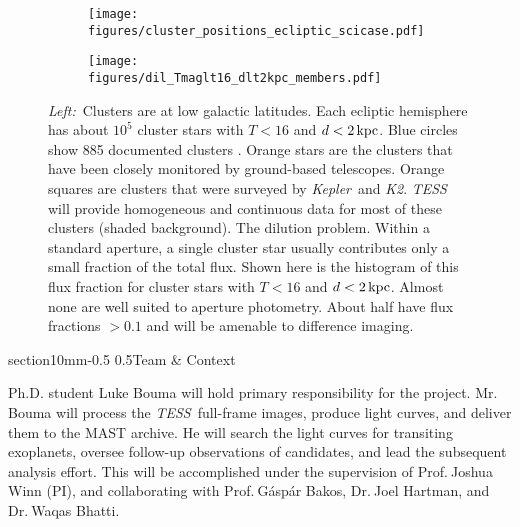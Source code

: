 \documentclass[letterpaper,11pt]{article}
\makeatletter
\renewcommand\section{\@startsection%
{section}{1}{0mm}{-0.5\baselineskip}%
{0.5\baselineskip}{\normalfont\normalsize\bfseries}}%
\newcommand{\tess}{{\it TESS}}
\newcommand{\kepler}{{\it Kepler}}
\newcommand{\ktwo}{{\it K2}}
\makeatother
\begin{document}
\begin{figure}[!tb]
    \begin{subfigure}{.6\textwidth}
        \centering
        \texttt{[image: figures/cluster\_positions\_ecliptic\_scicase.pdf]}
    \end{subfigure}
    \begin{subfigure}{.4\textwidth}
        \centering
        \texttt{[image: figures/dil\_Tmaglt16\_dlt2kpc\_members.pdf]}
    \end{subfigure}
    \caption{ {\it Left:\,} Clusters are at low galactic latitudes. Each
      ecliptic hemisphere has about $10^5$ cluster stars with
      $T<16$ and $d < 2\,{\rm kpc}$. Blue circles show 885
      documented clusters \citep{Kharchenko_et_al_2013}. Orange stars are the
      clusters that have been closely monitored by ground-based telescopes. 
      Orange squares are clusters that were surveyed by \kepler\ and \ktwo.
      {\it TESS} will provide homogeneous and continuous data for most of 
      these clusters (shaded background).  
     The dilution problem. Within a standard
    aperture, a single cluster star usually contributes only a small
    fraction of the total flux. Shown here is the histogram of this
    flux fraction for cluster stars with $T<16$ and $d<2\,{\rm
      kpc}$. Almost none are well suited to aperture photometry. About
    half have flux fractions $>0.1$ and will be amenable to difference
    imaging. 
    \label{fig:cluster_positions_dilution}
    }
\end{figure}

\vspace{-0.3mm}
\section{Team \& Context}
\vspace{-0.3mm}

Ph.D. student Luke Bouma will hold primary responsibility for the project.
Mr.$\ $Bouma will process the \tess\ full-frame images, produce light curves, 
and deliver them to the MAST archive. He will search the light curves for 
transiting exoplanets, oversee follow-up observations of candidates, and lead 
the subsequent analysis effort.
This will be accomplished under the supervision of Prof.$\ $Joshua Winn (PI), 
and collaborating with Prof.$\ $G\'asp\'ar Bakos, Dr.$\ $Joel Hartman, and 
Dr.$\ $Waqas Bhatti.
\end{document}
